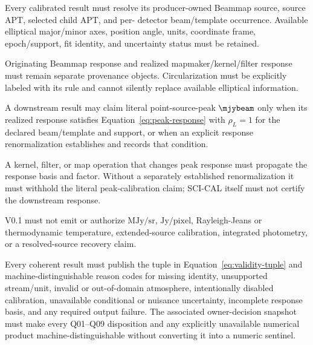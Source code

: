 \begin{description}[style=nextline]
\item[\Req{040}: originating response basis.]
  Every calibrated result must resolve its producer-owned Beammap source,
  source APT, selected child APT, and per-
  detector beam/template occurrence. Available elliptical major/minor axes,
  position angle, units, coordinate frame, epoch/support, fit identity, and
  uncertainty status must be retained.

\item[\Req{041}: realized response distinction.]
  Originating Beammap response and realized mapmaker/kernel/filter response
  must remain separate provenance objects. Circularization must be explicitly
  labeled with its rule and cannot silently replace available elliptical
  information.

\item[\Req{042}: point-source-peak condition.]
  A downstream result may claim literal point-source-peak \(\mjybeam\) only
  when its realized response satisfies Equation~\eqref{eq:peak-response} with
  \(\rho_L=1\) for the declared beam/template and support, or when an explicit
  response renormalization establishes and records that condition.

\item[\Req{043}: response-changing operations.]
  A kernel, filter, or map operation that changes peak response must propagate
  the response basis and factor. Without a separately established
  renormalization it must withhold the literal peak-calibration claim; SCI-CAL
  itself must not certify the downstream response.

\item[\Req{044}: excluded photometric meanings.]
  V0.1 must not emit or authorize \(\mathrm{MJy/sr}\), \(\mathrm{Jy/pixel}\),
  Rayleigh-Jeans or thermodynamic temperature, extended-source calibration,
  integrated photometry, or a resolved-source recovery claim.

\item[\Req{045}: validity tuple and causes.]
  Every coherent result must publish the tuple in
  Equation~\eqref{eq:validity-tuple} and machine-distinguishable reason codes
  for missing identity, unsupported stream/unit, invalid or out-of-domain
  atmosphere, intentionally disabled calibration, unavailable conditional or
  nuisance uncertainty, incomplete response basis, and any required output
  failure. The associated owner-decision snapshot must make every Q01--Q09
  disposition and any explicitly unavailable numerical product
  machine-distinguishable without converting it into a numeric sentinel.


\end{description}
